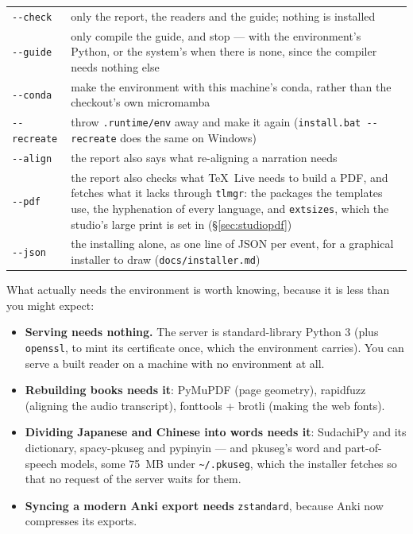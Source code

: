 \documentclass[11pt,oneside]{report}
\newcommand{\file}[1]{\texttt{#1}}
\begin{document}
\begin{center}
\begin{tabular}{@{}>{\raggedright\arraybackslash}p{}>{\raggedright\arraybackslash}p{}@{}}
\toprule
\texttt{-{}-check} & only the report, the readers and the guide; nothing is
  installed \\
\addlinespace
\texttt{-{}-guide} & only compile the guide, and stop --- with the
  environment's Python, or the system's when there is none, since the
  compiler needs nothing else \\
\addlinespace
\texttt{-{}-conda} & make the environment with this machine's conda, rather
  than the checkout's own micromamba \\
\addlinespace
\texttt{-{}-recreate} & throw \file{.runtime/env} away and make it again
  (\file{install.bat -{}-recreate} does the same on Windows) \\
\addlinespace
\texttt{-{}-align} & the report also says what re-aligning a narration
  needs \\
\addlinespace
\texttt{-{}-pdf} & the report also checks what TeX~Live needs to build a
  PDF, and fetches what it lacks through \texttt{tlmgr}: the packages the
  templates use, the hyphenation of every language, and \texttt{extsizes},
  which the studio's large print is set in (\S\ref{sec:studiopdf}) \\
\addlinespace
\texttt{-{}-json} & the installing alone, as one line of JSON per event,
  for a graphical installer to draw (\file{docs/installer.md}) \\
\bottomrule
\end{tabular}
\end{center}

What actually needs the environment is worth knowing, because it is less
than you might expect:

\begin{itemize}
\item \textbf{Serving needs nothing.} The server is standard-library
  Python 3 (plus \texttt{openssl}, to mint its certificate once, which the
  environment carries). You can serve a built reader on a machine with no
  environment at all.
\item \textbf{Rebuilding books needs it}: PyMuPDF (page geometry),
  rapidfuzz (aligning the audio transcript), fonttools + brotli (making the
  web fonts).
\item \textbf{Dividing Japanese and Chinese into words needs it}: SudachiPy
  and its dictionary, spacy-pkuseg and pypinyin --- and pkuseg's word and
  part-of-speech models, some 75~MB under \texttt{\textasciitilde/.pkuseg},
  which the installer fetches so that no request of the server waits for
  them.
\item \textbf{Syncing a modern Anki export needs} \texttt{zstandard},
  because Anki now compresses its exports.
\end{itemize}
\end{document}
